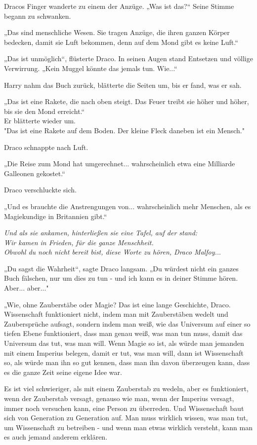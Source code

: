 {Dracos Finger wanderte zu einem der Anzüge. „Was ist das?“ Seine Stimme begann zu schwanken.

„Das sind menschliche Wesen. Sie tragen Anzüge, die ihren ganzen Körper bedecken, damit sie Luft bekommen, denn auf dem Mond gibt es keine Luft.“

„Das ist unmöglich“, flüsterte Draco. In seinen Augen stand Entsetzen und völlige Verwirrung. „Kein Muggel könnte das jemals tun. Wie...“

Harry nahm das Buch zurück, blätterte die Seiten um, bis er fand, was er sah.

„Das ist eine Rakete, die nach oben steigt. Das Feuer treibt sie höher und höher, bis sie den Mond erreicht.“\\ Er blätterte wieder um.\\ "Das ist eine Rakete auf dem Boden. Der kleine Fleck daneben ist ein Mensch."

Draco schnappte nach Luft.

„Die Reise zum Mond hat umgerechnet... wahrscheinlich etwa eine Milliarde Galleonen gekostet.“

Draco verschluckte sich.

„Und es brauchte die Anstrengungen von... wahrscheinlich mehr Menschen, als es Magiekundige in Britannien gibt.“

\emph{Und als sie ankamen, hinterließen sie eine Tafel, auf der stand:}\\ \emph{Wir kamen in Frieden, für die ganze Menschheit.}\\ \emph{Obwohl du noch nicht bereit bist, diese Worte zu hören, Draco Malfoy..}.

„Du sagst die Wahrheit“, sagte Draco langsam. „Du würdest nicht ein ganzes Buch fälschen, nur um dies zu tun - und ich kann es in deiner Stimme hören. Aber... aber..."

„Wie, ohne Zauberstäbe oder Magie? Das ist eine lange Geschichte, Draco. Wissenschaft funktioniert nicht, indem man mit Zauberstäben wedelt und Zaubersprüche aufsagt, sondern indem man weiß, wie das Universum auf einer so tiefen Ebene funktioniert, dass man genau weiß, was man tun muss, damit das Universum das tut, was man will. Wenn Magie so ist, als würde man jemanden mit einem Imperius belegen, damit er tut, was man will, dann ist Wissenschaft so, als würde man ihn so gut kennen, dass man ihn davon überzeugen kann, dass es die ganze Zeit seine eigene Idee war.

Es ist viel schwieriger, als mit einem Zauberstab zu wedeln, aber es funktioniert, wenn der Zauberstab versagt, genauso wie man, wenn der Imperius versagt, immer noch versuchen kann, eine Person zu überreden. Und Wissenschaft baut sich von Generation zu Generation auf. Man muss wirklich wissen, was man tut, um Wissenschaft zu betreiben - und wenn man etwas wirklich versteht, kann man es auch jemand anderem erklären.

}
